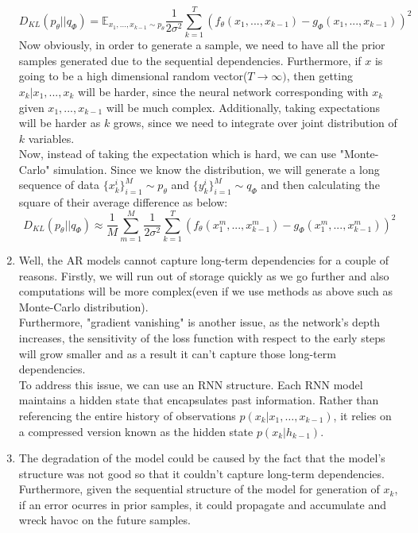 \documentclass{article}
\begin{document}
\begin{enumerate}
    \begin{equation*}
        D_{KL}(p_\theta || q_\Phi) = \mathbb{E}_{x_1,...,x_{k-1} \sim p_\theta} \frac{1}{2\sigma^2}\sum_{k=1}^T (f_\theta(x_1,...,x_{k-1}) - g_\Phi(x_1,...,x_{k-1}))^2
    \end{equation*}
    Now obviously, in order to generate a sample, we need to have all the prior samples generated due to the sequential dependencies.
    Furthermore, if $x$ is going to be a high dimensional random vector($T \rightarrow \infty)$, then getting $x_k | x_1, ..., x_k$ will be harder, since the neural network corresponding with $x_k$ given $x_1, ..., x_{k-1}$ will be much complex. Additionally, taking expectations will be harder as $k$ grows, since we need to integrate over joint distribution of $k$ variables.
    \\
    Now, instead of taking the expectation which is hard, we can use "Monte-Carlo" simulation. Since we know the distribution, we will generate a long sequence of data $\{x_k^i\}_{i=1}^M \sim p_\theta$ and  $\{y_k^i\}_{i=1}^M \sim q_\Phi$ and then calculating the square of their average difference as below:
    \begin{equation*}
        D_{KL}(p_\theta || q_\Phi) \approx \frac{1}{M} \sum_{m=1}^M  \frac{1}{2\sigma^2}\sum_{k=1}^T (f_\theta(x_1^m,...,x_{k-1}^m) - g_\Phi(x_1^m,...,x_{k-1}^m))^2
    \end{equation*}
    \item Well, the AR models cannot capture long-term dependencies for a couple of reasons. Firstly, we will run out of storage quickly as we go further and also computations will be more complex(even if we use methods as above such as Monte-Carlo distribution).\\
    Furthermore, "gradient vanishing" is another issue, as the network's depth increases, the sensitivity of the loss function with respect to the early steps will grow smaller and as a result it can't capture those long-term dependencies.
    \\
    To address this issue, we can use an RNN structure. Each RNN model maintains a hidden state that encapsulates past information. Rather than referencing the entire history of observations \( p(x_k | x_1, \ldots, x_{k-1}) \), it relies on a compressed version known as the hidden state \( p(x_k | h_{k-1}) \).
    \item The degradation of the model could be caused by the fact that the model's structure was not good so that it couldn't capture long-term dependencies. Furthermore, given the sequential structure of the model for generation of $x_k$, if an error ocurres in prior samples, it could propagate and accumulate and wreck havoc on the future samples.
\end{enumerate}
\end{document}
